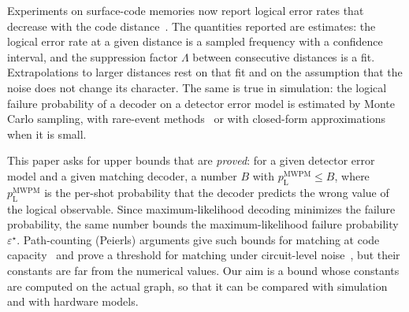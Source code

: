 \documentclass[11pt]{article}
\theoremstyle{plain}
\theoremstyle{definition}
\theoremstyle{remark}
\newcommand{\pM}{p_{\mathrm{L}}^{\mathrm{MWPM}}}
\newcommand{\err}{\varepsilon^{\star}}
\renewcommand{\_}{\oldunderscore\allowbreak}
\begin{document}
Experiments on surface-code memories now report logical error rates that decrease with the code distance~\cite{Google21,Google22,Google24}. The quantities reported are estimates: the logical error rate at a given distance is a sampled frequency with a confidence interval, and the suppression factor $\Lambda$ between consecutive distances is a fit. Extrapolations to larger distances rest on that fit and on the assumption that the noise does not change its character. The same is true in simulation: the logical failure probability of a decoder on a detector error model is estimated by Monte Carlo sampling, with rare-event methods~\cite{BV,Mayer} or with closed-form approximations~\cite{Regev} when it is small.

This paper asks for upper bounds that are \emph{proved}: for a given detector error model and a given matching decoder, a number $B$ with $\pM\le B$, where $\pM$ is the per-shot probability that the decoder predicts the wrong value of the logical observable. Since maximum-likelihood decoding minimizes the failure probability, the same number bounds the maximum-likelihood failure probability $\err$. Path-counting (Peierls) arguments give such bounds for matching at code capacity~\cite{DKLP} and prove a threshold for matching under circuit-level noise~\cite{Fowler}, but their constants are far from the numerical values. Our aim is a bound whose constants are computed on the actual graph, so that it can be compared with simulation and with hardware models.
\end{document}
